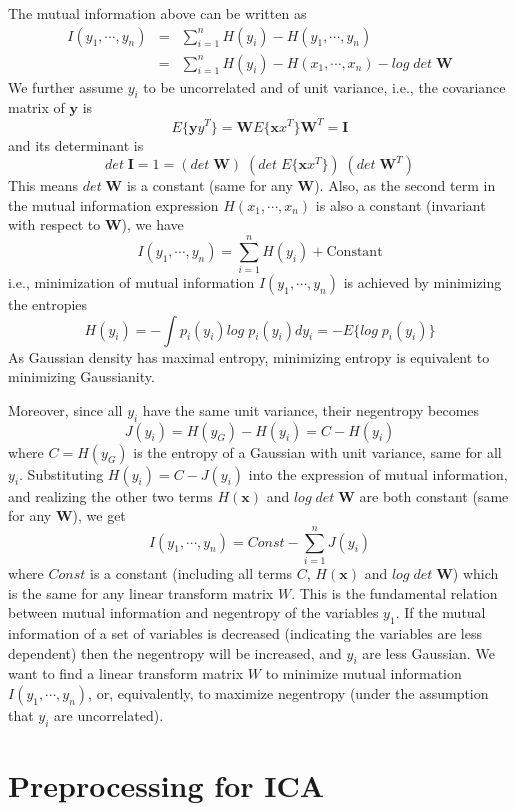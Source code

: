 \documentclass[12pt, a4paper, onecolumn]{IEEEtran}
\begin{document}
The mutual information above can be written as
\begin{eqnarray}
I(y_1,\cdots,y_n)&=&\sum_{i=1}^n H(y_i)-H(y_1,\cdots,y_n)
	\nonumber \\
	&=&\sum_{i=1}^n H(y_i)-H(x_1,\cdots,x_n)-log\;det\; {\mathbf W}
	\nonumber
\end{eqnarray}
We further assume $y_i$ to be uncorrelated and of unit variance, i.e., the
covariance matrix of ${\mathbf y}$ is
\[
E\{{\mathbf yy^T}\}={\mathbf W}E\{{\mathbf xx^T}\}{\mathbf W^T}={\mathbf I}
\]
and its determinant is
\[	det\;{\mathbf I}=1=(det\;{\mathbf W})\;(det\;E\{{\mathbf xx}^T\})
	\;(det\;{\mathbf W}^T)	\]
This means $det\;{\mathbf W}$ is a constant (same for any ${\mathbf W}$). Also,
as the second term in the mutual information expression $H(x_1,\cdots,x_n)$ is
also a constant (invariant with respect to ${\mathbf W}$), we have
\[	I(y_1,\cdots,y_n)=\sum_{i=1}^n H(y_i)+\mbox{Constant}	\]
i.e., minimization of mutual information $I(y_1,\cdots,y_n)$ is achieved by
minimizing the entropies
\[	H(y_i)=-\int p_i(y_i) log\;p_i(y_i) dy_i=-E\{ log\;p_i(y_i) \}	\]
As Gaussian density has maximal entropy, minimizing entropy is equivalent to
minimizing Gaussianity.

Moreover, since all $y_i$ have the same unit variance, their negentropy becomes
\[	J(y_i)=H(y_G)-H(y_i)=C-H(y_i)	\]
where $C=H(y_G)$ is the entropy of a Gaussian with unit variance, same for
all $y_i$. Substituting $H(y_i)=C-J(y_i)$ into the expression of mutual
information, and realizing the other two terms $H({\mathbf x})$ and
$log\;det\;{\mathbf W}$ are both constant (same for any ${\mathbf W}$), we get
\[	I(y_1,\cdots,y_n)=Const-\sum_{i=1}^n J(y_i)	\]
where $Const$ is a constant (including all terms $C$, $H({\mathbf x})$ and
$log\;det\;{\mathbf W}$)
which is the same for any linear transform matrix $W$. This is the fundamental
relation between mutual information and negentropy of the variables $y_1$. If
the mutual information of a set of variables is decreased (indicating the
variables are less dependent) then the negentropy will be increased, and $y_i$
are less Gaussian. We want to find a linear transform matrix $W$ to minimize
mutual information $I(y_1,\cdots,y_n)$, or, equivalently, to maximize negentropy
(under the assumption that $y_i$ are uncorrelated).

\section{Preprocessing for ICA}
\end{document}
